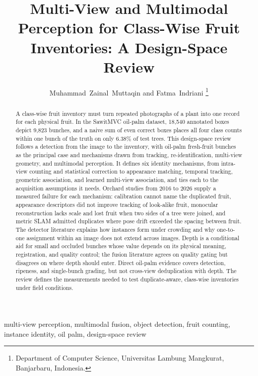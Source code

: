 \documentclass[journal]{IEEEtran}
\begin{document}
\title{Multi-View and Multimodal Perception for Class-Wise Fruit Inventories: A Design-Space Review}
\author{Muhammad~Zainal~Muttaqin and Fatma~Indriani%
\thanks{Department of Computer Science, Universitas Lambung Mangkurat, Banjarbaru, Indonesia.}}
\maketitle
\begin{abstract}
A class-wise fruit inventory must turn repeated photographs of a plant into
one record for each physical fruit. In the SawitMVC oil-palm dataset, 18,540
annotated boxes depict 9,823 bunches, and a naive sum of even correct boxes places
all four class counts within one bunch of the truth on only 6.38\% of test trees. This design-space
review follows a detection from the image to the inventory, with oil-palm
fresh-fruit bunches as the principal case and mechanisms drawn from tracking,
re-identification, multi-view geometry, and multimodal perception. It defines
six identity mechanisms, from intra-view counting and statistical correction to
appearance matching, temporal tracking, geometric association, and learned
multi-view association, and ties each to the acquisition assumptions it needs.
Orchard studies from 2016 to 2026 supply a measured failure for each mechanism:
calibration cannot name the duplicated fruit, appearance descriptors did not
improve tracking of look-alike fruit, monocular reconstruction lacks scale and
lost fruit when two sides of a tree were joined, and metric SLAM admitted
duplicates where pose drift exceeded the spacing between fruit. The detector
literature explains how instances form under crowding and why one-to-one
assignment within an image does not extend across images. Depth is a
conditional aid for small and occluded bunches whose value depends on its
physical meaning, registration, and quality control; the fusion literature
agrees on quality gating but disagrees on where depth should enter. Direct
oil-palm evidence covers detection, ripeness, and single-bunch grading, but
not cross-view deduplication with depth. The review defines the measurements
needed to test duplicate-aware, class-wise inventories under field conditions.
\end{abstract}
\begin{IEEEkeywords}
multi-view perception, multimodal fusion, object detection, fruit counting,
instance identity, oil palm, design-space review
\end{IEEEkeywords}



\end{document}
